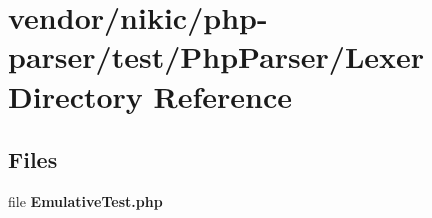 \section{vendor/nikic/php-\/parser/test/\+Php\+Parser/\+Lexer Directory Reference}
\label{dir_3f0d55359f0a2af53aa8be980c9cb677}
\subsection*{Files}
\begin{DoxyCompactItemize}
\item 
file {\bf Emulative\+Test.\+php}
\end{DoxyCompactItemize}
